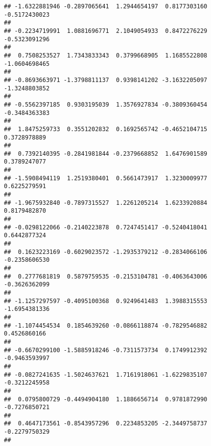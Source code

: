 \documentclass[]{article}
\begin{document}
\begin{verbatim}
## -1.6322881946 -0.2897065641  1.2944654197  0.8177303160 -0.5172430023 
##                                                                       
## -0.2234719991  1.0881696771  2.1049054933  0.8472276229 -0.5323091296 
##                                                                       
##  0.7508253527  1.7343833343  0.3799668905  1.1685522808 -1.0604698465 
##                                                                       
## -0.8693663971 -1.3798811137  0.9398141202 -3.1632205097 -1.3248803852 
##                                                                       
## -0.5562397185  0.9303195039  1.3576927834 -0.3809360454 -0.3484363383 
##                                                                       
##  1.8475259733  0.3551202832  0.1692565742 -0.4652104715  0.3728978889 
##                                                                       
##  0.7392140395 -0.2841981844 -0.2379668852  1.6476901589  0.3789247077 
##                                                                       
## -1.5908494119  1.2519380401  0.5661473917  1.3230009977  0.6225279591 
##                                                                       
## -1.9675932840 -0.7897315527  1.2261205214  1.6233920884  0.8179482870 
##                                                                       
## -0.0298122066 -0.2140223878  0.7247451417 -0.5240418041  0.6442877324 
##                                                                       
##  0.1623223169 -0.6029023572 -1.2935379212 -0.2834066106 -0.2358606530 
##                                                                       
##  0.2777681819  0.5879759535 -0.2153104781 -0.4063643006 -0.3626362099 
##                                                                       
## -1.1257297597 -0.4095100368  0.9249641483  1.3988315553 -1.6954381336 
##                                                                       
## -1.1074454534  0.1854639260 -0.0866118874 -0.7829546882  0.4526860166 
##                                                                       
## -0.6670299100 -1.5885918246 -0.7311573734  0.1749912392 -0.9463593997 
##                                                                       
## -0.0827241635 -1.5024637621  1.7161918061 -1.6229835107 -0.3212245958 
##                                                                       
##  0.0795800729 -0.4494904180  1.1886656714  0.9781872990 -0.7276850721 
##                                                                       
##  0.4647173561 -0.8543957296  0.2234853205 -2.3449758737 -0.2279750329 
##                                                                       

\end{verbatim}
\end{document}
